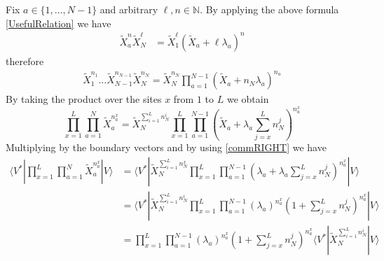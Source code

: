 \documentclass[10pt]{article}
\numberwithin{equation}{section}
\numberwithin{equation}{subsection}
\begin{document}
Fix $ a\in \{1,\ldots,N-1\}$ and arbitrary $ \ell,n\in \mathbb{N}$. By applying the above formula \eqref{UsefulRelation} we have
\begin{align}\label{usefulRelaton-many}
	\widetilde{X}_{a}^{n}\widetilde{X}_{N}^{\ell}&=%
	\widetilde{X}_{1}^{\ell}\left(\widetilde{X}_{a}+\ell\lambda_{a}\right)^{n}
\end{align}
therefore 
\begin{align*}
	\widetilde{X}_{1}^{n_{1}}\ldots\widetilde{X}_{N-1}^{n_{N-1}}\widetilde{X}_{N}^{n_{N}}=\widetilde{X}_{N}^{n_{N}}\prod_{a=1}^{N-1}\left(\widetilde{X}_{a}+n_{N}\lambda_{a}\right)^{n_{a}}
\end{align*}
By taking the product over the sites $x$ from $1$ to $L$ we obtain 
\begin{equation}
	\prod_{x=1}^{L}\prod_{a=1}^{N}\widetilde{X}_{a}^{n_{a}^{x}}=\widetilde{X}_{N}^{\sum_{i=1}^{L}n_{N}^{i}}\prod_{x=1}^{L}\prod_{a=1}^{N-1}\left(\widetilde{X}_{a}+\lambda_{a}\sum_{j=x}^{L}n_{N}^{j}\right)^{n_{a}^{x}}
\end{equation}
Multiplying by the boundary vectors and by using \eqref{commRIGHT} we have 
\begin{align}
	\langle V^{*}|\prod_{x=1}^{L}\prod_{a=1}^{N}\widetilde{X}_{a}^{n_{a}^{x}}
	|V \rangle\nonumber&=\langle V^{*}|\widetilde{X}_{N}^{\sum_{i=1}^{L}n_{N}^{x}}\prod_{x=1}^{L}\prod_{a=1}^{N-1}\left(\lambda_{a}+\lambda_{a}\sum_{j=x}^{L}n_{N}^{j}\right)^{n_{a}^{x}}|V\rangle\nonumber
	\\&=
	\langle V^{*}|\widetilde{X}_{N}^{\sum_{i=1}^{L}n_{N}^{i}}\prod_{x=1}^{L}\prod_{a=1}^{N-1}\left(\lambda_{a}\right)^{n_{a}^{x}}\left(1+\sum_{j=x}^{L}n_{N}^{j}\right)^{n_{a}^{x}}|V\rangle\nonumber
	\\&=
	\prod_{x=1}^{L}\prod_{a=1}^{N-1}\left(\lambda_{a}\right)^{n_{a}^{x}}\left(1+\sum_{j=x}^{L}n_{N}^{j}\right)^{n_{a}^{x}}\langle V^{*}|\widetilde{X}_{N}^{\sum_{i=1}^{L}n_{N}^{i}}|V\rangle
\end{align}
\end{document}
